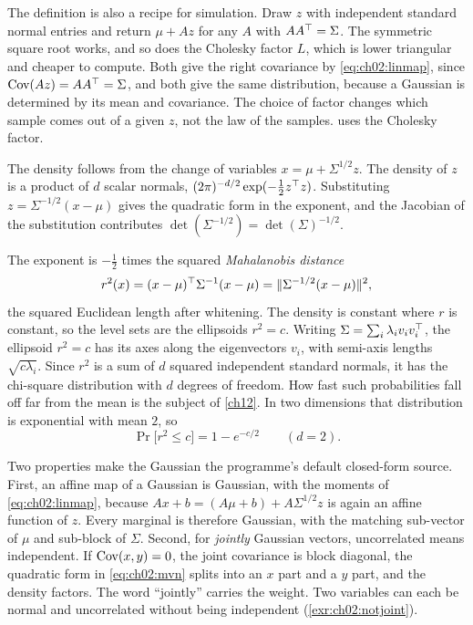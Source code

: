 The definition is also a recipe for simulation. Draw $z$ with independent
standard normal entries and return $\mu+Az$ for any $A$ with $AA^{\top}=\Sigma$. The
symmetric square root works, and so does the Cholesky factor $L$, which is
lower triangular and cheaper to compute. Both give the right covariance by
\cref{eq:ch02:linmap}, since $\operatorname{Cov}(Az)=AA^{\top}=\Sigma$, and both give the same
distribution, because a Gaussian is determined by its mean and covariance. The
choice of factor changes which sample comes out of a given $z$, not the law of
the samples.  uses the Cholesky factor.

The density follows from the change of variables $x=\mu+\Sigma^{1/2}z$. The
density of $z$ is a product of $d$ scalar normals,
$(2\pi)^{-d/2}\exp(-\tfrac12z^{\top} z)$. Substituting
$z=\Sigma^{-1/2}(x-\mu)$ gives the quadratic form in the exponent, and the
Jacobian of the substitution contributes $\det(\Sigma^{-1/2})=\det(\Sigma)^{-1/2}$.

The exponent is $-\tfrac12$ times the squared \emph{Mahalanobis distance}
\begin{equation}\label{eq:ch02:mahal}
r^2(x)=(x-\mu)^{\top}\Sigma^{-1}(x-\mu)=\lVert \Sigma^{-1/2}(x-\mu)\rVert^2 ,
\end{equation}
the squared Euclidean length after whitening. The density is constant where
$r$ is constant, so the level sets are the ellipsoids $r^2=c$. Writing
$\Sigma=\sum_i\lambda_iv_iv_i^{\top}$, the ellipsoid $r^2=c$ has its axes along the
eigenvectors $v_i$, with semi-axis lengths $\sqrt{c\lambda_i}$. Since $r^2$ is
a sum of $d$ squared independent standard normals, it has the chi-square
distribution with $d$ degrees of freedom. How fast such probabilities fall off far
from the mean is the subject of \cref{ch12}. In two dimensions that distribution
is exponential with mean $2$, so
\begin{equation}\label{eq:ch02:chi2}
\Pr\big[r^2\le c\big]=1-e^{-c/2}\qquad(d=2).
\end{equation}

Two properties make the Gaussian the programme's default closed-form source.
First, an affine map of a Gaussian is Gaussian, with the moments of
\cref{eq:ch02:linmap}, because $Ax+b=(A\mu+b)+A\Sigma^{1/2}z$ is again an
affine function of $z$. Every marginal is therefore Gaussian, with the
matching sub-vector of $\mu$ and sub-block of $\Sigma$. Second, for
\emph{jointly} Gaussian vectors, uncorrelated means independent. If
$\operatorname{Cov}(x,y)=0$, the joint covariance is block diagonal, the quadratic form in
\cref{eq:ch02:mvn} splits into an $x$ part and a $y$ part, and the density
factors. The word ``jointly'' carries the weight. Two variables can each be
normal and uncorrelated without being independent (\cref{exr:ch02:notjoint}).

